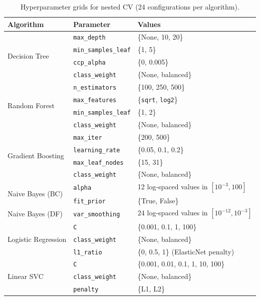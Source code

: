\documentclass{article}
\begin{document}
\begin{table}[h]
\centering
\caption{Hyperparameter grids for nested CV (24 configurations per algorithm).}
\label{tab:grids}
\small
\begin{tabular}{llp{6.5cm}}
\toprule
Algorithm & Parameter & Values \\
\midrule
\multirow{4}{*}{Decision Tree}
  & \texttt{max\_depth}        & \{None, 10, 20\} \\
  & \texttt{min\_samples\_leaf}& \{1, 5\} \\
  & \texttt{ccp\_alpha}        & \{0, 0.005\} \\
  & \texttt{class\_weight}     & \{None, balanced\} \\
\midrule
\multirow{4}{*}{Random Forest}
  & \texttt{n\_estimators}     & \{100, 250, 500\} \\
  & \texttt{max\_features}     & \{\texttt{sqrt}, \texttt{log2}\} \\
  & \texttt{min\_samples\_leaf}& \{1, 2\} \\
  & \texttt{class\_weight}     & \{None, balanced\} \\
\midrule
\multirow{4}{*}{Gradient Boosting}
  & \texttt{max\_iter}         & \{200, 500\} \\
  & \texttt{learning\_rate}    & \{0.05, 0.1, 0.2\} \\
  & \texttt{max\_leaf\_nodes}  & \{15, 31\} \\
  & \texttt{class\_weight}     & \{None, balanced\} \\
\midrule
\multirow{2}{*}{Naive Bayes (BC)}
  & \texttt{alpha}             & 12 log-spaced values in $[10^{-3}, 100]$ \\
  & \texttt{fit\_prior}        & \{True, False\} \\
\midrule
Naive Bayes (DF)
  & \texttt{var\_smoothing}    & 24 log-spaced values in $[10^{-12}, 10^{-3}]$ \\
\midrule
\multirow{3}{*}{Logistic Regression}
  & \texttt{C}                 & \{0.001, 0.1, 1, 100\} \\
  & \texttt{class\_weight}     & \{None, balanced\} \\
  & \texttt{l1\_ratio}         & \{0, 0.5, 1\} (ElasticNet penalty) \\
\midrule
\multirow{3}{*}{Linear SVC}
  & \texttt{C}                 & \{0.001, 0.01, 0.1, 1, 10, 100\} \\
  & \texttt{class\_weight}     & \{None, balanced\} \\
  & \texttt{penalty}           & \{L1, L2\} \\
\bottomrule
\end{tabular}
\end{table}
\end{document}
